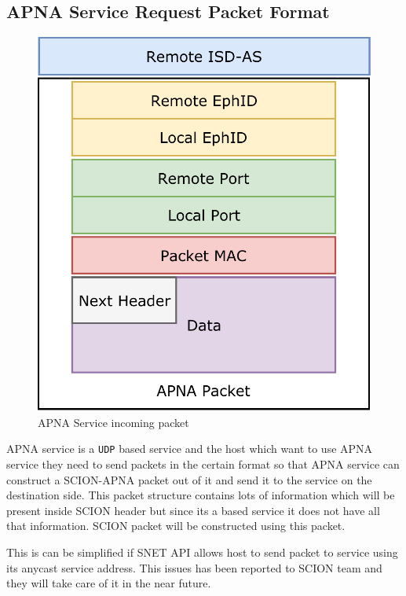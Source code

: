 \subsection{APNA Service Request Packet Format}
\begin{figure}[th!!]
\centering
\includegraphics[scale=0.6]{Figures/apna_svc_request_pkt.pdf}
\decoRule
\caption[APNA Service Incoming Packet]{APNA Service incoming packet}
\label{fig:apna_svc_request_pkt}
\end{figure}
APNA service is a \texttt{UDP} based service and the host which want to use APNA service they need to send packets in the certain format so that APNA service can construct a SCION-APNA packet out of it and send it to the service on the destination side. This packet structure contains lots of information which will be present inside SCION header but since its a based service it does not have all that information. SCION packet will be constructed using this packet.

This is can be simplified if SNET API allows host to send packet to service using its anycast service address. This issues has been reported to SCION team and they will take care of it in the near future. 

